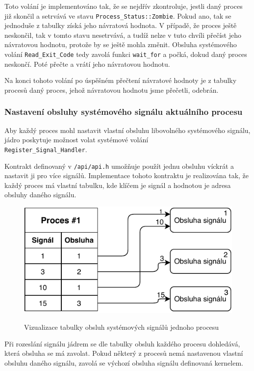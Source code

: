 \documentclass[12pt, a4paper]{article}
\begin{document}
Toto volání je implementováno tak, že se nejdřív zkontroluje, jestli daný proces již skončil a setrvává ve stavu \texttt{Process\_Status::Zombie}. Pokud ano, tak se jednoduše z tabulky získá jeho návratová hodnota. V případě, že proces ještě neskončil, tak v tomto stavu nesetrvává, a tudíž nelze v tuto chvíli přečíst jeho návratovou hodnotu, protože by se ještě mohla změnit. Obsluha systémového volání \texttt{Read\_Exit\_Code} tedy zavolá funkci \texttt{wait\_for} a počká, dokud daný proces neskončí. Poté přečte a vrátí jeho návratovou hodnotu.

 Na konci tohoto volání po úspěšném přečtení návratové hodnoty je z tabulky procesů daný proces, jehož návratovou hodnotu jsme přečetli, odebrán.

\subsubsection{Nastavení obsluhy systémového signálu aktuálního procesu}
Aby každý proces mohl nastavit vlastní obsluhu libovolného systémového signálu, jádro poskytuje možnost volat systémové volání\\ \texttt{Register\_Signal\_Handler}.

Kontrakt definovaný v \texttt{/api/api.h} umožňuje použít jednu obsluhu víckrát a nastavit ji pro více signálů. Implementace tohoto kontraktu je realizována tak, že každý proces má vlastní tabulku, kde klíčem je signál a hodnotou je adresa obsluhy daného signálu.

\begin{figure}[!ht]
\centering
{\includegraphics[width=11.5cm]{pdf/register_signal_handler.pdf}}
\caption{Vizualizace tabulky obsluh systémových signálů jednoho procesu}
\label{fig:screen-transition-diagram}
\end{figure}

Při rozeslání signálu jádrem se dle tabulky obsluh každého procesu dohledává, která obsluha se má zavolat. Pokud některý z procesů nemá nastavenou vlastní obsluhu daného signálu, zavolá se výchozí obsluha signálu definovaná kernelem.
\end{document}
